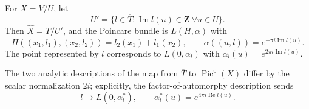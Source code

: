 \begin{proposition}
\label{mumford-source-analytic-dual}
For $X=V/U$, let
\[
 U'=\{l\in\overline T:\operatorname{Im}l(u)\in\mathbf Z\ \forall u\in U\}.
\]
Then $\widehat X=\overline T/U'$, and the Poincare bundle is
$L(H,\alpha)$ with
\[
 H((x_1,l_1),(x_2,l_2))=\overline{l_2(x_1)}+l_1(x_2),
 \qquad \alpha((u,l))=e^{-\pi i\operatorname{Im}l(u)}.
\]
The point represented by $l$ corresponds to $L(0,\alpha_l)$ with
$\alpha_l(u)=e^{2\pi i\operatorname{Im}l(u)}$.
\notready
\end{proposition}

\begin{remark}
\label{mumford-source-analytic-dual-normalization}
The two analytic descriptions of the map from $\overline T$ to
$\operatorname{Pic}^0(X)$ differ by the scalar normalization $2i$; explicitly,
the factor-of-automorphy description sends
\[
 l\longmapsto L(0,\alpha_l^*),
 \qquad \alpha_l^*(u)=e^{4\pi i\operatorname{Re}l(u)}.
\]
\end{remark}
